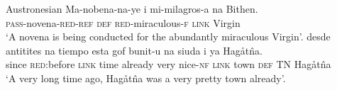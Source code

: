 \documentclass[output=collectionpaper]{langsci/langscibook}
\begin{document}
\ea\label{ex:dgm:8:Chamorro}
 {Austronesian} {\citealt[123]{Stolz2012}}
\ea
\gll Ma-nobena-na-ye i mi-milagros-a na Bithen. \\
\textsc{pass-}novena-\textsc{red-ref} \textsc{def} \textsc{red}-miraculous-\textsc{f} \textsc{link} Virgin \\
\glt`A novena is being conducted for the abundantly miraculous Virgin'.
\ex
\gll desde antitites na tiempo esta gof bunit-u na siuda i ya Hag\r{a}t\^na. \\
since \textsc{red:}before \textsc{link} time already very nice-\textsc{nf} \textsc{link} town \textsc{def} \textsc{TN} Hag\r{a}t\^na \\
\glt `A very long time ago,  Hag\r{a}t\^na was a very pretty town already'.
\z
\z
\end{document}
